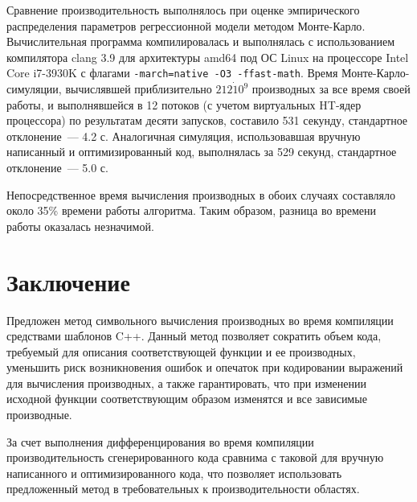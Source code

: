 \documentclass[11pt,a4paper]{article}
\begin{document}
Сравнение производительность выполнялось при оценке эмпирического распределения
параметров регрессионной модели методом Монте-Карло\cite{Rudoy15MonteCarlo}.
Вычислительная программа компилировалась и выполнялась с использованием компилятора
clang 3.9 для архитектуры amd64 под ОС Linux на процессоре Intel Core i7-3930K
с флагами \texttt{-march=native -O3 -ffast-math}. Время Монте-Карло-симуляции,
вычислявшей приблизительно $212 \dot 10^9$ производных за все время своей работы,
и выполнявшейся в 12 потоков (с учетом виртуальных HT-ядер процессора) по результатам
десяти запусков, составило 531 секунду, стандартное отклонение~--- 4.2 с.
Аналогичная симуляция, использовавшая вручную написанный и оптимизированный код,
выполнялась за 529 секунд, стандартное отклонение~--- 5.0 с.

Непосредственное время вычисления производных в обоих случаях составляло около
35\% времени работы алгоритма. Таким образом, разница во времени работы оказалась
незначимой.

\section{Заключение}

Предложен метод символьного вычисления производных во время компиляции средствами
шаблонов C++. Данный метод позволяет сократить объем кода, требуемый для описания
соответствующей функции и ее производных, уменьшить риск возникновения ошибок и
опечаток при кодировании выражений для вычисления производных, а также гарантировать,
что при изменении исходной функции соответствующим образом изменятся и все зависимые
производные.

За счет выполнения дифференцирования во время компиляции производительность
сгенерированного кода сравнима с таковой для вручную написанного и оптимизированного
кода, что позволяет использовать предложенный метод в требовательных к производительности
областях.


%
%

\end{document}
